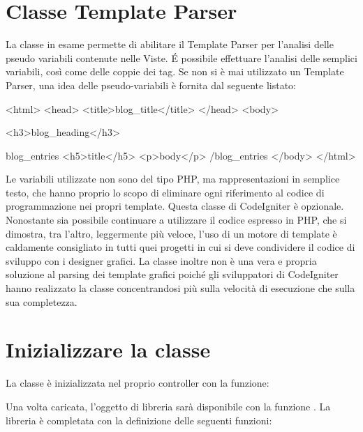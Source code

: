 \section{Classe Template Parser}
\label{class:templateparser}

La classe in esame permette di abilitare il Template Parser per l'analisi delle pseudo variabili contenute nelle Viste. \'E possibile effettuare l'analisi delle semplici variabili, così come delle coppie dei tag. Se non si è mai utilizzato un Template Parser, una idea delle  pseudo-variabili è fornita dal seguente listato:

\begin{html}
<html>
<head>
<title>{blog_title}</title>
</head>
<body>

<h3>{blog_heading}</h3>

{blog_entries}
<h5>{title}</h5>
<p>{body}</p>
{/blog_entries}
</body>
</html>
\end{html}

Le variabili utilizzate non sono del tipo \ac{PHP}, ma rappresentazioni in semplice testo, che hanno proprio lo scopo di eliminare ogni riferimento al codice di programmazione nei propri template. Questa classe di CodeIgniter è opzionale. Nonostante sia possibile continuare a utilizzare il codice espresso in \ac{PHP}, che si dimostra, tra l'altro, leggermente più veloce, l'uso di un motore di template è caldamente consigliato in tutti quei progetti in cui si deve condividere il codice di sviluppo con i designer grafici. La classe inoltre non è una vera e propria soluzione al parsing dei template grafici poiché gli sviluppatori di CodeIgniter hanno realizzato la classe concentrandosi più sulla velocità di esecuzione che sulla sua completezza.

\section*{Inizializzare la classe}
La classe è inizializzata nel proprio controller con la funzione:


Una volta caricata, l'oggetto di libreria sarà disponibile con la funzione . La libreria è completata con la definizione delle seguenti funzioni:

